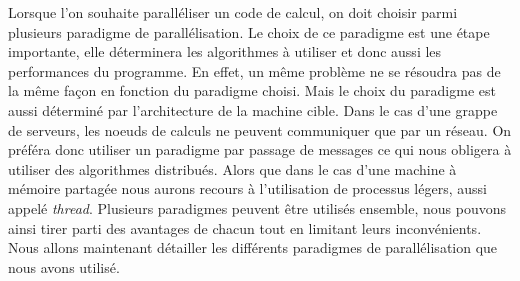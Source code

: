 Lorsque l'on souhaite paralléliser un code de calcul, on doit choisir parmi plusieurs paradigme de parallélisation.
%
Le choix de ce paradigme est une étape importante, elle déterminera les algorithmes à utiliser et donc aussi les performances du programme.
%
En effet, un même problème ne se résoudra pas de la même façon en fonction du paradigme choisi.
%
Mais le choix du paradigme est aussi déterminé par l'architecture de la machine cible.
%
Dans le cas d'une grappe de serveurs, les noeuds de calculs ne peuvent communiquer que par un réseau.
%
On préféra donc utiliser un paradigme par passage de messages ce qui nous obligera à utiliser des algorithmes distribués.
%
Alors que dans le cas d'une machine à mémoire partagée nous aurons recours à l'utilisation de processus légers, aussi appelé {\em thread}.
%
Plusieurs paradigmes peuvent être utilisés ensemble, nous pouvons ainsi tirer parti des avantages de chacun tout en limitant leurs inconvénients.
%
Nous allons maintenant détailler les différents paradigmes de parallélisation que nous avons utilisé.
